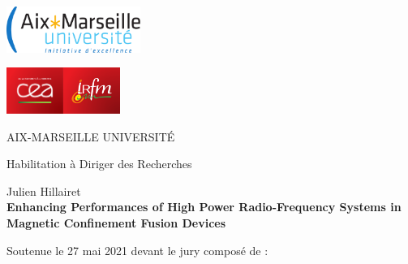 \thispagestyle{empty}
\vspace*{-2.0cm}
\begin{center}
  \begin{minipage}[c]{0.70\linewidth}
    \raggedright\includegraphics[height=1.5cm]{Figs/logo_amu_excellence}
  \end{minipage}\hfill
  \begin{minipage}[c]{0.30\linewidth}
    \raggedleft\includegraphics[height=1.5cm]{Figs/CEA_logo_quadri-sur-fond-rouge}\quad\includegraphics[height=1.5cm]{Figs/IRFM_rouge}
 \end{minipage}\hfill
\end{center}
\begin{flushleft}
  \vspace{0.2cm}
  \LARGE AIX-MARSEILLE UNIVERSIT\'E\\
  \vspace{0.2cm}
  \vspace{0.2cm}
  \begin{center}
    \vspace{3.8cm}
    Habilitation \`a Diriger des Recherches\\
  \end{center}
  \vspace{0.5cm}
  \begin{center}
    \vspace{0.4cm}
    \Large Julien Hillairet\\
    \vspace{1cm}
    \LARGE\textbf{Enhancing Performances of High Power Radio-Frequency Systems in Magnetic Confinement Fusion Devices}\\
    \vspace{0.5cm}
  \end{center}
  \vspace{1cm}
  \normalsize Soutenue le 27 mai 2021 devant le jury compos\'e de :\\
\end{flushleft}
